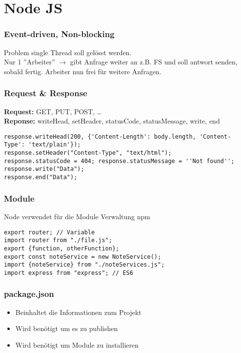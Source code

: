 
\section{Node JS}

\subsubsection{Event-driven, Non-blocking}
Problem single Thread soll gelösst werden.\\
Nur 1 ''Arbeiter'' $\rightarrow$ gibt Anfrage weiter an z.B. FS und soll antwort senden, sobald fertig. Arbeiter nun frei für weitere Anfragen.

\subsubsection{Request \& Response}
\textbf{Request:} GET, PUT, POST, \dots\\
\textbf{Reponse:} writeHead, setHeader, statusCode, statusMessage, write, end
\begin{lstlisting}
response.writeHead(200, {'Content-Length': body.length, 'Content-Type': 'text/plain'});
response.setHeader("Content-Type", "text/html");
response.statusCode = 404; response.statusMessage = ''Not found'';
response.write("Data");
response.end("Data");
\end{lstlisting}


\subsubsection{Module}
Node verwendet für die Module Verwaltung npm
\begin{lstlisting}
export router; // Variable
import router from "./file.js";
export {function, otherFunction};
export const noteService = new NoteService();
import {noteService} from "./noteServices.js";
import express from "express"; // ES6
\end{lstlisting}
\subsubsection{package.json}
\begin{itemize}
    \item Beinhaltet die Informationen zum Projekt
    \item Wird benötigt um es zu publishen
    \item Wird benötigt um Module zu installieren
\end{itemize}





